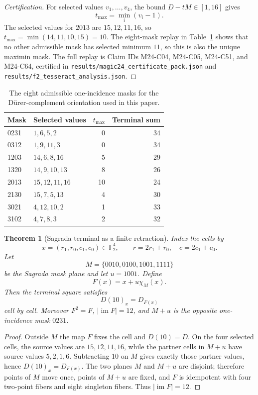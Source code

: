 \documentclass[11pt,a4paper]{article}
\newtheorem{theorem}{Theorem}[section]
\theoremstyle{definition}
\theoremstyle{remark}
\newcommand{\F}{\mathbb F}
\newcommand{\Durer}{D\"urer\xspace}
\begin{document}
\begin{proof}[Certification]
For selected values \(v_1,\ldots,v_4\), the bound \(D-tM\in[1,16]\) gives
\[
t_{\max}=\min_i(v_i-1).
\]
The selected values for \(2013\) are \(15,12,11,16\), so
\(t_{\max}=\min(14,11,10,15)=10\).  The eight-mask replay in
Table~\ref{tab:durer-masks} shows that no other admissible mask has selected
minimum \(11\), so this is also the unique maximin mask.  The full replay is
Claim IDs M24-C04, M24-C05, M24-C51, and M24-C64, certified in
\texttt{results/magic24\_certificate\_pack.json} and
\texttt{results/f2\_tesseract\_analysis.json}.
\end{proof}

\begin{table}[htbp]
\centering
\begin{tabular}{llrr}
\toprule
Mask & Selected values & \(t_{\max}\) & Terminal sum\\
\midrule
0231 & \(1,6,5,2\) & 0 & 34\\
0312 & \(1,9,11,3\) & 0 & 34\\
1203 & \(14,6,8,16\) & 5 & 29\\
1320 & \(14,9,10,13\) & 8 & 26\\
2013 & \(15,12,11,16\) & 10 & 24\\
2130 & \(15,7,5,13\) & 4 & 30\\
3021 & \(4,12,10,2\) & 1 & 33\\
3102 & \(4,7,8,3\) & 2 & 32\\
\bottomrule
\end{tabular}
\caption{The eight admissible one-incidence masks for the \Durer-complement
orientation used in this paper.}
\label{tab:durer-masks}
\end{table}

\begin{theorem}[Sagrada terminal as a finite retraction]
\label{thm:sagrada-retraction}
Index the cells by
\[
  x=(r_1,r_0,c_1,c_0)\in \F_2^4,
  \qquad r=2r_1+r_0,\quad c=2c_1+c_0.
\]
Let
\[
  M=\{0010,0100,1001,1111\}
\]
be the Sagrada mask plane and let \(u=1001\).  Define
\[
  F(x)=x+u\chi_M(x).
\]
Then the terminal square satisfies
\[
  D(10)_x=D_{F(x)}
\]
cell by cell.  Moreover \(F^2=F\), \(|\operatorname{im}F|=12\), and
\(M+u\) is the opposite one-incidence mask \(0231\).
\end{theorem}

\begin{proof}
Outside \(M\) the map \(F\) fixes the cell and \(D(10)=D\).  On the four
selected cells, the source values are \(15,12,11,16\), while the partner cells
in \(M+u\) have source values \(5,2,1,6\).  Subtracting \(10\) on \(M\) gives
exactly those partner values, hence \(D(10)_x=D_{F(x)}\).  The two planes
\(M\) and \(M+u\) are disjoint; therefore points of \(M\) move once, points of
\(M+u\) are fixed, and \(F\) is idempotent with four two-point fibers and eight
singleton fibers.  Thus \(|\operatorname{im}F|=12\).
\end{proof}
\end{document}
